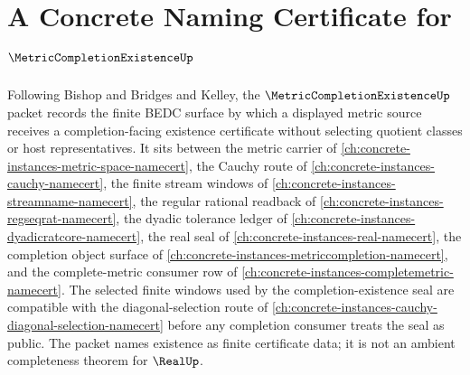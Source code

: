 \chapter{A Concrete Naming Certificate for $\MetricCompletionExistenceUp$}
\label{ch:concrete-instances-metric-completion-existence-namecert}

Following Bishop and Bridges and Kelley, the $\MetricCompletionExistenceUp$ packet records the finite BEDC surface by which a displayed metric source receives a completion-facing existence certificate without selecting quotient classes or host representatives. It sits between the metric carrier of \autoref{ch:concrete-instances-metric-space-namecert}, the Cauchy route of \autoref{ch:concrete-instances-cauchy-namecert}, the finite stream windows of \autoref{ch:concrete-instances-streamname-namecert}, the regular rational readback of \autoref{ch:concrete-instances-regseqrat-namecert}, the dyadic tolerance ledger of \autoref{ch:concrete-instances-dyadicratcore-namecert}, the real seal of \autoref{ch:concrete-instances-real-namecert}, the completion object surface of \autoref{ch:concrete-instances-metriccompletion-namecert}, and the complete-metric consumer row of \autoref{ch:concrete-instances-completemetric-namecert}. The selected finite windows used by the completion-existence seal are compatible with the diagonal-selection route of \autoref{ch:concrete-instances-cauchy-diagonal-selection-namecert} before any completion consumer treats the seal as public. The packet names existence as finite certificate data; it is not an ambient completeness theorem for $\RealUp$.

